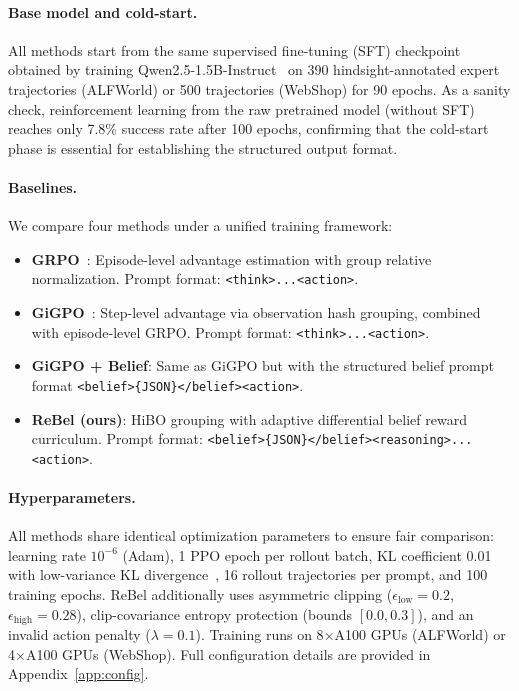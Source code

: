 \paragraph{Base model and cold-start.}
All methods start from the same supervised fine-tuning (SFT) checkpoint obtained by
training Qwen2.5-1.5B-Instruct~\citep{qwen2.5} on 390 hindsight-annotated expert
trajectories (ALFWorld) or 500 trajectories (WebShop) for 90 epochs.
As a sanity check, reinforcement learning from the raw pretrained model (without SFT)
reaches only 7.8\% success rate after 100 epochs, confirming that the cold-start
phase is essential for establishing the structured output format.

\paragraph{Baselines.}
We compare four methods under a unified training framework:
\begin{itemize}[leftmargin=1.5em,itemsep=2pt]
  \item \textbf{GRPO}~\citep{shao2024deepseekmath}: Episode-level advantage
    estimation with group relative normalization.
    Prompt format: \texttt{<think>...<action>}.
  \item \textbf{GiGPO}~\citep{feng2025gigpo}: Step-level advantage via
    observation hash grouping, combined with episode-level GRPO.
    Prompt format: \texttt{<think>...<action>}.
  \item \textbf{GiGPO + Belief}: Same as GiGPO but with the structured belief
    prompt format \texttt{<belief>\{JSON\}</belief><action>}.
  \item \textbf{ReBel (ours)}: HiBO grouping with adaptive differential belief
    reward curriculum.
    Prompt format: \texttt{<belief>\{JSON\}</belief><reasoning>...<action>}.
\end{itemize}

\paragraph{Hyperparameters.}
All methods share identical optimization parameters to ensure fair comparison:
learning rate $10^{-6}$ (Adam), 1 PPO epoch per rollout batch, KL coefficient 0.01
with low-variance KL divergence~\citep{schulman2017proximal}, 16 rollout trajectories per prompt,
and 100 training epochs.
ReBel additionally uses asymmetric clipping ($\epsilon_{\text{low}}=0.2$,
$\epsilon_{\text{high}}=0.28$), clip-covariance entropy protection
(bounds $[0.0, 0.3]$), and an invalid action penalty ($\lambda=0.1$).
Training runs on 8$\times$A100 GPUs (ALFWorld) or 4$\times$A100 GPUs (WebShop).
Full configuration details are provided in Appendix~\ref{app:config}.

